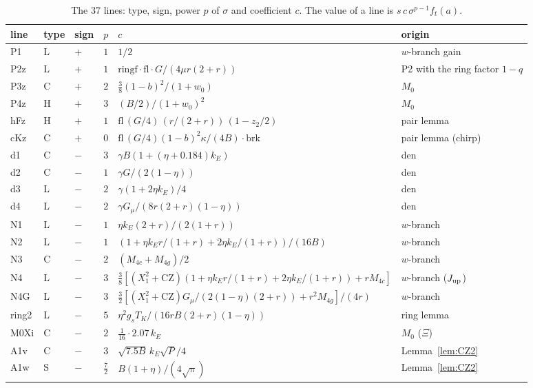 \begin{table}
\caption{The 37 lines: type, sign, power $p$ of $\sigma$ and coefficient $c$. The value of a line is $s\,c\,\sigma^{p-1}f_t(a)$.}
\label{tab:lines37}
\begin{ruledtabular}
\small
\begin{tabular}{p{}p{}p{}p{}p{}p{}}
line & type & sign & $p$ & $c$ & origin\\ \hline
P1 & L & $+$ & $1$ & $1/2$ & $w$-branch gain\\
P2z & L & $+$ & $1$ & $\mathrm{ringf}\cdot\mathrm{fl}\cdot G/(4\mu r(2+r))$ & P2 with the ring factor $1-q$\\
P3z & C & $+$ & $2$ & $\frac38(1-b)^2/(1+w_0)$ & $M_0$\\
P4z & H & $+$ & $3$ & $(B/2)/(1+w_0)^2$ & $M_0$\\
hFz & H & $+$ & $1$ & $\mathrm{fl}\,(G/4)\,(r/(2+r))\,(1-z_2/2)$ & pair lemma\\
cKz & C & $+$ & $0$ & $\mathrm{fl}\,(G/4)(1-b)^2\kappa/(4B)\cdot\mathrm{brk}$ & pair lemma (chirp)\\
d1 & C & $-$ & $3$ & $\gamma B(1+(\eta+0.184)k_E)$ & den\\
d2 & C & $-$ & $1$ & $\gamma G/(2(1-\eta))$ & den\\
d3 & L & $-$ & $2$ & $\gamma(1+2\eta k_E)/4$ & den\\
d4 & L & $-$ & $2$ & $\gamma G_\mu/(8r(2+r)(1-\eta))$ & den\\
N1 & L & $-$ & $1$ & $\eta k_E(2+r)/(2(1+r))$ & $w$-branch\\
N2 & L & $-$ & $1$ & $(1+\eta k_Er/(1+r)+2\eta k_E/(1+r))/(16B)$ & $w$-branch\\
N3 & C & $-$ & $2$ & $(M_{4c}+M_{4g})/2$ & $w$-branch\\
N4 & L & $-$ & $3$ & $\frac38[(X_1^2+\mathrm{CZ})(1+\eta k_Er/(1+r)+2\eta k_E/(1+r))+rM_{4c}]$ & $w$-branch ($J_{\rm up}$)\\
N4G & L & $-$ & $3$ & $\frac32[(X_1^2+\mathrm{CZ})G_\mu/(2(1-\eta)(2+r))+r^2M_{4g}]/(4r)$ & $w$-branch\\
ring2 & L & $-$ & $5$ & $\eta^2g_sT_K/(16rB(2+r)(1-\eta))$ & ring lemma\\
M0Xi & C & $-$ & $2$ & $\frac1{16}\cdot2.07\,k_E$ & $M_0$ ($\Xi$)\\
A1v & C & $-$ & $3$ & $\sqrt{7.5B}\,k_E\sqrt P/4$ & Lemma~\ref{lem:CZ2}\\
A1w & S & $-$ & $\frac72$ & $B(1+\eta)/(4\sqrt\pi)$ & Lemma~\ref{lem:CZ2}\\

\end{tabular}
\end{ruledtabular}
\end{table}
